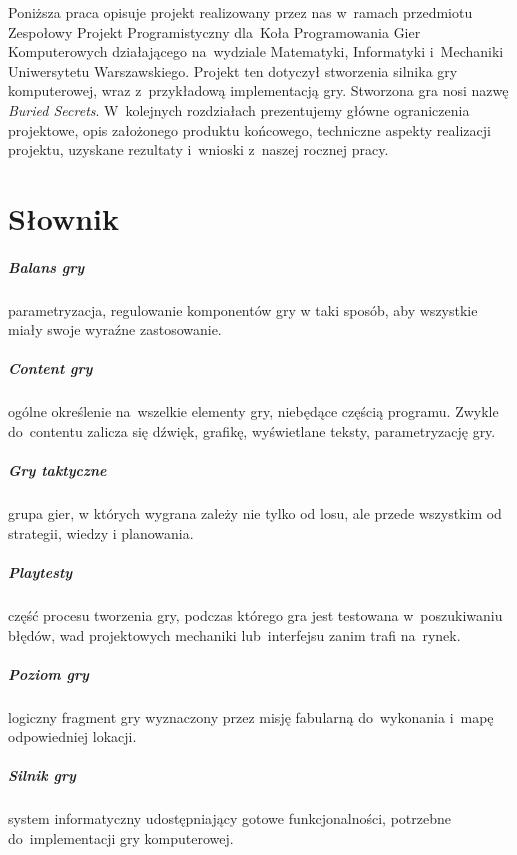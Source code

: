 \documentclass[licencjacka]{pracamgr}
\begin{document}
  Poniższa praca opisuje projekt realizowany przez nas w~ramach przedmiotu Zespołowy Projekt Programistyczny dla~Koła Programowania
  Gier Komputerowych\cite{PROGRY} działającego na~wydziale Matematyki, Informatyki i~Mechaniki Uniwersytetu Warszawskiego.
  Projekt ten dotyczył stworzenia silnika gry komputerowej, wraz z~przykładową implementacją gry. Stworzona gra nosi nazwę
  \emph{Buried Secrets}. W~kolejnych rozdziałach prezentujemy główne ograniczenia projektowe, opis założonego produktu końcowego,
  techniczne aspekty realizacji projektu, uzyskane rezultaty i~wnioski z~naszej rocznej pracy.


\chapter{Słownik}
  \paragraph{Balans gry} parametryzacja, regulowanie komponentów gry w taki sposób, aby wszystkie miały swoje wyraźne zastosowanie.
  \paragraph{Content gry} ogólne określenie na~wszelkie elementy gry, niebędące częścią programu. Zwykle do~contentu zalicza się
    dźwięk, grafikę, wyświetlane teksty, parametryzację gry.
  \paragraph{Gry taktyczne} grupa gier, w których wygrana zależy nie tylko od losu, ale przede wszystkim od strategii, wiedzy i planowania.
  \paragraph{Playtesty} część procesu tworzenia gry, podczas którego gra jest testowana w~poszukiwaniu błędów, wad projektowych mechaniki
    lub~interfejsu zanim trafi na~rynek.
  \paragraph{Poziom gry} logiczny fragment gry wyznaczony przez misję fabularną do~wykonania i~mapę odpowiedniej lokacji.
  \paragraph{Silnik gry} system informatyczny udostępniający gotowe funkcjonalności, potrzebne do~implementacji gry komputerowej.
\end{document}
